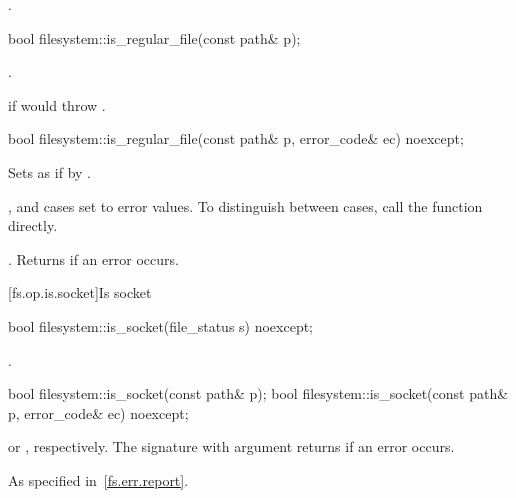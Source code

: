 \begin{itemdescr}
\pnum
\returns
{}.
\end{itemdescr}

%
\begin{itemdecl}
bool filesystem::is_regular_file(const path& p);
\end{itemdecl}

\begin{itemdescr}
\pnum
\returns
{}.

\pnum
\throws
{} if  would throw .
\end{itemdescr}

%
\begin{itemdecl}
bool filesystem::is_regular_file(const path& p, error_code& ec) noexcept;
\end{itemdecl}

\begin{itemdescr}
\pnum
\effects
Sets  as if by .
\begin{note}
,  and
   cases set  to error values. To distinguish between cases, call the  function directly.
\end{note}

\pnum
\returns
{}.
Returns  if an error occurs.
\end{itemdescr}


[fs.op.is.socket]{Is socket}

%
\begin{itemdecl}
bool filesystem::is_socket(file_status s) noexcept;
\end{itemdecl}

\begin{itemdescr}
\pnum
\returns
{}.
\end{itemdescr}

%
\begin{itemdecl}
bool filesystem::is_socket(const path& p);
bool filesystem::is_socket(const path& p, error_code& ec) noexcept;
\end{itemdecl}

\begin{itemdescr}
\pnum
\returns
{} or
  , respectively. The signature with argument
   returns  if an error occurs.

\pnum
\throws
As specified in~\ref{fs.err.report}.
\end{itemdescr}



